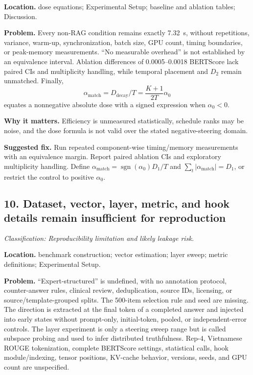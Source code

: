 \documentclass[11pt]{article}
\newcommand{\findinglabel}[1]{\textbf{#1}}
\newcommand{\classification}[1]{\textit{Classification: #1.}}
\begin{document}
\findinglabel{Location.} dose equations; Experimental Setup; baseline and ablation tables; Discussion.

\findinglabel{Problem.} Every non-RAG condition remains exactly 7.32~s, without repetitions, variance, warm-up, synchronization, batch size, GPU count, timing boundaries, or peak-memory measurements.  ``No measurable overhead'' is not established by an equivalence interval.  Ablation differences of 0.0005--0.0018 BERTScore lack paired CIs and multiplicity handling, while temporal placement and $D_2$ remain unmatched.  Finally,
\[
\alpha_{\mathrm{match}}=D_{\mathrm{decay}}/T
=\frac{K+1}{2T}\alpha_0
\]
equates a nonnegative absolute dose with a signed expression when $\alpha_0<0$.

\findinglabel{Why it matters.} Efficiency is unmeasured statistically, schedule ranks may be noise, and the dose formula is not valid over the stated negative-steering domain.

\findinglabel{Suggested fix.} Run repeated component-wise timing/memory measurements with an equivalence margin.  Report paired ablation CIs and exploratory multiplicity handling.  Define $\alpha_{\mathrm{match}}=\operatorname{sgn}(\alpha_0)D_1/T$ and $\sum_t|\alpha_{\mathrm{match}}|=D_1$, or restrict the control to positive $\alpha_0$.

\subsection*{10. Dataset, vector, layer, metric, and hook details remain insufficient for reproduction}

\classification{Reproducibility limitation and likely leakage risk}

\findinglabel{Location.} benchmark construction; vector estimation; layer sweep; metric definitions; Experimental Setup.

\findinglabel{Problem.} ``Expert-structured'' is undefined, with no annotation protocol, counter-answer rules, clinical review, deduplication, source IDs, licensing, or source/template-grouped splits.  The 500-item selection rule and seed are missing.  The direction is extracted at the final token of a completed answer and injected into early states without prompt-only, initial-token, pooled, or independent-error controls.  The layer experiment is only a steering sweep range but is called subspace probing and used to infer distributed truthfulness.  Rep-4, Vietnamese ROUGE tokenization, complete BERTScore settings, statistical calls, hook module/indexing, tensor positions, KV-cache behavior, versions, seeds, and GPU count are unspecified.
\end{document}

